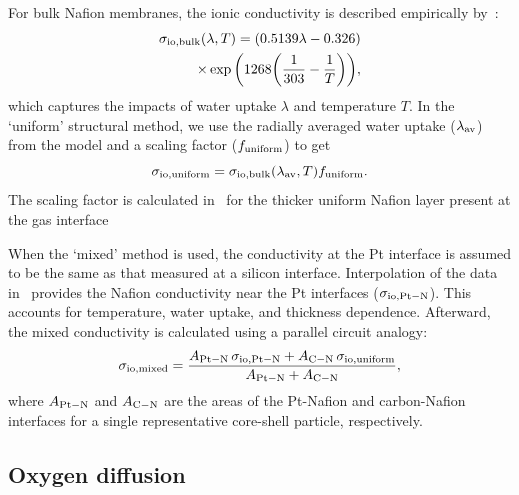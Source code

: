 \documentclass[final,3p,times,twocolumn]{elsarticle}    %
\begin{document}
For bulk Nafion membranes, the ionic conductivity is described empirically by~\cite{bib:springer_1991}:
\begin{equation} \label{eq:sigma-bulk}
\begin{split}
    \sigma_{\rm io, bulk}(\lambda,T) = (0.5139\lambda - 0.326) \\
                                     \times \exp \bigg( 1268 \bigg( \frac{1}{303} 
                                     - \frac{1}{T} \bigg) \bigg),
\end{split}
\end{equation}
which captures the impacts of water uptake $\lambda$ and temperature $T$. In the `uniform' structural method, we use the radially averaged water uptake ($\lambda_{\rm av}$) from the model and a scaling factor ($f_{\rm uniform}$) to get 
\begin{equation} \label{eq:sigma-uniform}
    \sigma_{\rm io, uniform} = \sigma_{\rm io, bulk}(\lambda_{\rm av},T) f_{\rm uniform}.
\end{equation}
The scaling factor is calculated in~\cite{bib:decaluwe_2018} for the thicker uniform Nafion layer present at the gas interface

When the `mixed' method is used, the conductivity at the Pt interface is assumed to be the same as that measured at a silicon interface. Interpolation of the data in~\cite{bib:paul_mccreery_2014} provides the Nafion conductivity near the Pt interfaces ($\sigma_{\rm io, Pt-N}$). This accounts for temperature, water uptake, and thickness dependence. Afterward, the mixed conductivity is calculated using a parallel circuit analogy: 
\begin{equation}
    \sigma_{\rm io, mixed} = 
    \frac{A_{\rm Pt-N}\,\sigma_{\rm io, Pt-N} + A_{\rm C-N}\,\sigma_{\rm io, uniform}}{A_{\rm Pt-N}+A_{\rm C-N}},
\end{equation}
where $A_{\rm Pt-N}$ and $A_{\rm C-N}$ are the areas of the Pt-Nafion and carbon-Nafion interfaces for a single representative core-shell particle, respectively.

\subsection{Oxygen diffusion}
\end{document}
